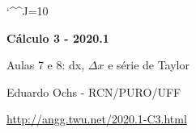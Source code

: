 \documentclass[oneside,12pt]{article}
\begin{document}
\catcode`\^^J=10



\long{}
\long{}
\long{}
\long{}
\long{}
\long{}
\long{}
\long{}
\long{}
\long{}

\long{}
\long{}

\def\frown{\ensuremath{{=}{(}}}
\def\True {\mathbf{V}}
\def\False{\mathbf{F}}

\def\drafturl{http://angg.twu.net/LATEX/2020-1-C2.pdf}
\def\drafturl{http://angg.twu.net/2020.1-C2.html}
\def\draftfooter{\tiny \href{\drafturl}{\jobname{}} \ColorBrown{\shorttoday{} \hours}}


%

\thispagestyle{empty}

\begin{center}

\vspace*{1.2cm}

{\bf \Large Cálculo 3 - 2020.1}

\bsk

Aulas 7 e 8: dx, $Δx$ e série de Taylor

\bsk

Eduardo Ochs - RCN/PURO/UFF

\url{http://angg.twu.net/2020.1-C3.html}

\end{center}

\newpage

\end{document}
